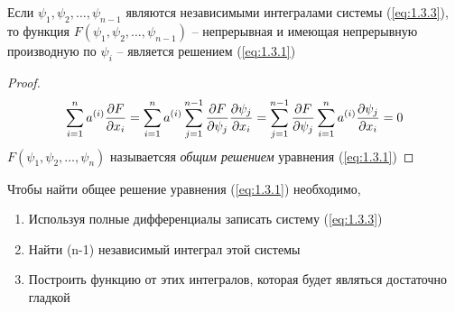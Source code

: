 \documentclass[../main.tex]{subfiles}
\begin{document}
\begin{theorem}
	Если $\psi_1, \psi_2, \dots, \psi_{n-1}$ являются независимыми интегралами системы (\ref*{eq:1.3.3}),
	то функция $F(\psi_1, \psi_2, \dots, \psi_{n-1})$ -- непрерывная и имеющая непрерывную
	производную по $\psi_i$ -- является решением (\ref*{eq:1.3.1})
\end{theorem}
\begin{proof}
	\begin{gather*}
		\sum_{i=1}^n a^{(i)}\frac{\partial F}{\partial x_i} =
		\sum_{i=1}^n a^{(i)} \sum_{j=1}^{n-1}\frac{\partial F}{\partial \psi_j}\frac{\partial \psi_j}{\partial x_i} =
		\sum_{j=1}^{n-1} \frac{\partial F}{\partial \psi_j}\sum_{i=1}^n a^{(i)} \frac{\partial \psi_j}{\partial x_i} = 0
	\end{gather*}
	$F(\psi_1, \psi_2,\dots,\psi_n)$ называетсяя \textit{общим решением} уравнения (\ref*{eq:1.3.1})
\end{proof}
Чтобы найти общее решение уравнения (\ref*{eq:1.3.1}) необходимо,
\begin{enumerate}
	\item Используя полные дифференциалы записать систему (\ref*{eq:1.3.3})
	\item Найти (n-1) независимый интеграл этой системы
	\item Построить функцию от этих интегралов, которая будет являться достаточно гладкой
\end{enumerate}
\end{document}
